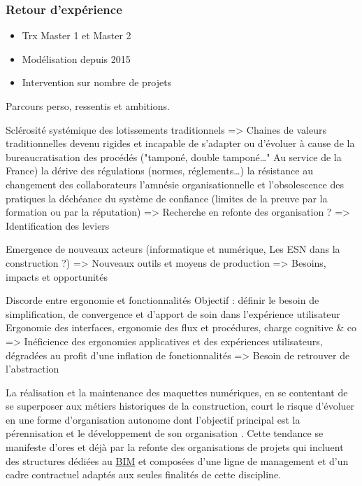 \documentclass[a4paper,12pt]{article}
\begin{document}
\subsubsection{Retour d'expérience}
\label{sec:org441874b}
\begin{itemize}
\item Trx Master 1 et Master 2
\item Modélisation depuis 2015
\item Intervention sur nombre de projets
\end{itemize}

Parcours perso, ressentis et ambitions.

Sclérosité systémique des lotissements traditionnels
=> Chaines de valeurs traditionnelles devenu rigides et incapable de s'adapter ou d'évoluer à cause de
      la bureaucratisation des procédés ("tamponé, double tamponé\ldots{}" Au service de la France)
      la dérive des régulations (normes, réglements\ldots{})   
      la résistance au changement des collaborateurs
      l'amnésie organisationnelle et l'obsolescence des pratiques
      la déchéance du système de confiance (limites de la preuve par la formation ou par la réputation)
=> Recherche en refonte des organisation ?
=> Identification des leviers

Emergence de nouveaux acteurs 
(informatique et numérique, Les ESN dans la construction ?)
=> Nouveaux outils et moyens de production
=> Besoins, impacts et opportunités

Discorde entre ergonomie et fonctionnalités
Objectif : définir le besoin de simplification, de convergence et d'apport de soin dans l'expérience utilisateur
Ergonomie des interfaces, ergonomie des flux et procédures, charge cognitive \& co
=> Inéficience des ergonomies applicatives et des expériences utilisateurs, dégradées au profit d'une inflation de fonctionnalités
=> Besoin de retrouver de l'abstraction

La réalisation et la maintenance des maquettes numériques, en se contentant de se superposer aux métiers historiques de la construction, court le risque d’évoluer en une forme d’organisation autonome dont l’objectif principal est la pérennisation et le développement de son organisation \autocite{lourauAnalyseInstitutionnelleQuestion1973}. Cette tendance se manifeste d’ores et déjà par la refonte des organisations de projets qui incluent des structures dédiées au \protect\hyperlink{gls-1}{\label{gls-1-use-9}BIM} et composées d’une ligne de management et d’un cadre contractuel adaptés aux seules finalités de cette discipline.
\end{document}
